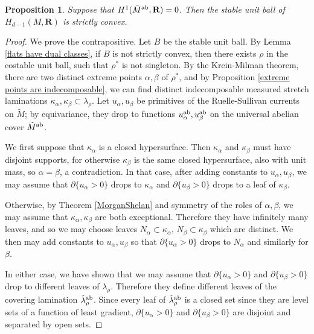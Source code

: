 \documentclass[reqno,11pt]{amsart}
\newcommand{\RR}{\mathbf{R}}
\newtheorem{proposition}[theorem]{Proposition}
\theoremstyle{definition}
\numberwithin{equation}{section}
\begin{document}
\begin{proposition}\label{abelian cover condition}
Suppose that $H^1(\tilde M^{\rm ab}, \RR) = 0$. 
Then the stable unit ball of $H_{d - 1}(M, \RR)$ is strictly convex.
\end{proposition}
\begin{proof}
We prove the contrapositive.
Let $B$ be the stable unit ball.
By Lemma \ref{flats have dual classes}, if $B$ is not strictly convex, then there exists $\rho$ in the costable unit ball, such that $\rho^*$ is not singleton.
By the Krein-Milman theorem, there are two distinct extreme points $\alpha, \beta$ of $\rho^*$, and by Proposition \ref{extreme points are indecomposable}, we can find distinct indecomposable measured stretch laminations $\kappa_\alpha, \kappa_\beta \subset \lambda_\rho$.
Let $u_\alpha, u_\beta$ be primitives of the Ruelle-Sullivan currents on $\tilde M$; by equivariance, they drop to functions $u^{\rm ab}_\alpha, u^{\rm ab}_\beta$ on the universal abelian cover $\tilde M^{\rm ab}$.

We first suppose that $\kappa_\alpha$ is a closed hypersurface.
Then $\kappa_\alpha$ and $\kappa_\beta$ must have disjoint supports, for otherwise $\kappa_\beta$ is the same closed hypersurface, also with unit mass, so $\alpha = \beta$, a contradiction.
In that case, after adding constants to $u_\alpha, u_\beta$, we may assume that $\partial \{u_\alpha > 0\}$ drops to $\kappa_\alpha$ and $\partial \{u_\beta > 0\}$ drops to a leaf of $\kappa_\beta$.

Otherwise, by Theorem \ref{MorganShelan} and symmetry of the roles of $\alpha, \beta$, we may assume that $\kappa_\alpha, \kappa_\beta$ are both exceptional.
Therefore they have infinitely many leaves, and so we may choose leaves $N_\alpha \subset \kappa_\alpha$, $N_\beta \subset \kappa_\beta$ which are distinct.
We then may add constants to $u_\alpha, u_\beta$ so that $\partial \{u_\alpha > 0\}$ drops to $N_\alpha$ and similarly for $\beta$.

In either case, we have shown that we may assume that $\partial \{u_\alpha > 0\}$ and $\partial \{u_\beta > 0\}$ drop to different leaves of $\lambda_\rho$.
Therefore they define different leaves of the covering lamination $\tilde \lambda^{\rm ab}_\rho$.
Since every leaf of $\tilde \lambda^{\rm ab}_\rho$ is a closed set since they are level sets of a function of least gradient, $\partial \{u_\alpha > 0\}$ and $\partial \{u_\beta > 0\}$ are disjoint and separated by open sets.


\end{proof}
\end{document}
